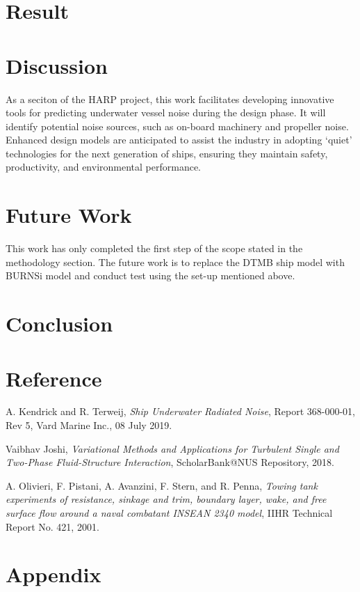 \documentclass[12pt]{article} %
\begin{document}
\section{Result}
\section{Discussion}
As a seciton of the HARP project, this work facilitates developing innovative tools for predicting underwater vessel noise during the design phase. It will identify potential noise sources, such as on-board machinery and propeller noise. Enhanced design models are anticipated to assist the industry in adopting `quiet' technologies for the next generation of ships, ensuring they maintain safety, productivity, and environmental performance.
\section{Future Work}
This work has only completed the first step of the scope stated in the methodology section. The future work is to replace the DTMB ship model with BURNSi model and conduct
test using the set-up mentioned above.
\section{Conclusion}



\section{Reference}
\begin{thebibliography}{99}
   
    A. Kendrick and R. Terweij, \emph{Ship Underwater Radiated Noise}, Report 368-000-01, Rev 5, Vard Marine Inc., 08 July 2019.
   
    Vaibhav Joshi, \emph{Variational Methods and Applications for Turbulent Single and Two-Phase Fluid-Structure Interaction}, ScholarBank@NUS Repository, 2018.
    
    A. Olivieri, F. Pistani, A. Avanzini, F. Stern, and R. Penna, \emph{Towing tank experiments of resistance, sinkage and trim, boundary layer, wake, and free surface flow around a naval combatant INSEAN 2340 model}, IIHR Technical Report No. 421, 2001.
\end{thebibliography}

\section{Appendix}
\end{document}
